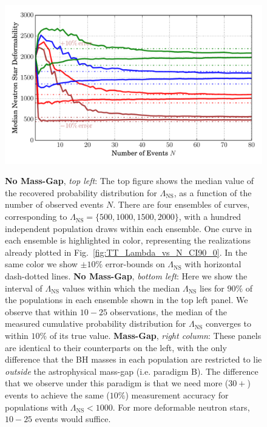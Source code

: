 \documentclass[aps,prd,amsmath,floats,floatfix, twocolumn,
superscriptaddress,nofootinbib,showpacs]{revtex4-1}
\newcommand{\lambdans}{\Lambda_\mathrm{NS}}
\begin{document}
\begin{figure}
\includegraphics[trim=0 0 1cm 0, width=1.025\columnwidth]{LambdaMedian90pc_vs_N_AstroPopulation}\\
\caption{
{\bf No Mass-Gap}, {\it top left}: The top figure shows the median value of the recovered
probability distribution for $\lambdans$, as a function of the number of observed 
events $N$. There are four ensembles of curves,
corresponding to $\lambdans=\{500,1000,1500,2000\}$, with a hundred
independent population draws within each ensemble. One curve in each ensemble
is highlighted in color, representing the realizations already plotted in
Fig.~\ref{fig:TT_Lambda_vs_N_CI90_0}.
In the same color we show $\pm 10\%$ error-bounds on $\lambdans$ with
horizontal dash-dotted lines.
{\bf No Mass-Gap}, {\it bottom left}: Here we show the interval of $\lambdans$ values within
which the median $\lambdans$ lies for $90\%$ of the populations in
each ensemble shown in the top left panel.
% 
We observe that within $10-25$ observations, the median of the measured 
cumulative probability distribution for $\lambdans$ converges to within $10\%$
of its true value.
% 
{\bf Mass-Gap}, {\it right column}: These panels are identical to their counterparts on the left,
with the only difference that the BH masses in each population are restricted
to lie {\it outside} the astrophysical mass-gap (i.e. paradigm B). The
difference that
we observe under this paradigm is that we need more ($30+$) events to achieve 
the same ($10\%$) measurement accuracy for populations with $\lambdans<1000$.
For more deformable neutron stars, $10-25$ events would suffice.
}
\label{fig:TT_LambdaMedian_vs_N_AllInOne}
\end{figure} 
% 
% 
\end{document}
